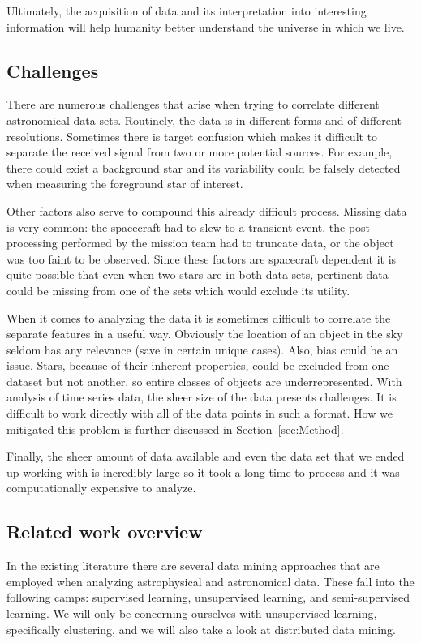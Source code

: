 \documentclass[12pt]{article}
\begin{document}
Ultimately, the acquisition of data and its interpretation into interesting information will help humanity better understand the universe in which we live.


\subsection{Challenges} %
\label{sub:Challenges}
There are numerous challenges that arise when trying to correlate different astronomical data sets.
Routinely, the data is in different forms and of different resolutions.
Sometimes there is target confusion which makes it difficult to separate the received signal from two or more potential sources.
For example, there could exist a background star and its variability could be falsely detected when measuring the foreground star of interest.

Other factors also serve to compound this already difficult process.
Missing data is very common: the spacecraft had to slew to a transient event, the post-processing performed by the mission team had to truncate data, or the object was too faint to be observed.
Since these factors are spacecraft dependent it is quite possible that even when two stars are in both data sets, pertinent data could be missing from one of the sets which would exclude its utility.

When it comes to analyzing the data it is sometimes difficult to correlate the separate features in a useful way.
Obviously the location of an object in the sky seldom has any relevance (save in certain unique cases).
Also, bias could be an issue.
Stars, because of their inherent properties, could be excluded from one dataset but not another, so entire classes of objects are underrepresented.
With analysis of time series data, the sheer size of the data presents challenges.
It is difficult to work directly with all of the data points in such a format.
How we mitigated this problem is further discussed in Section~\ref{sec:Method}.

Finally, the sheer amount of data available and even the data set that we ended up working with is incredibly large so it took a long time to process and it was computationally expensive to analyze.


\subsection{Related work overview} %
\label{sub:Related work overview}
In the existing literature there are several data mining approaches that are employed when analyzing astrophysical and astronomical data. 
These fall into the following camps: supervised learning, unsupervised learning, and semi-supervised learning. 
We will only be concerning ourselves with unsupervised learning, specifically clustering, and we will also take a look at distributed data mining.
\end{document}
